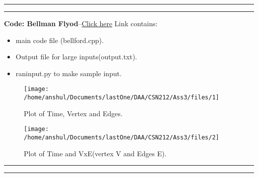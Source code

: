 \documentclass[a4paper,12pt]{article}
\begin{document}
\rule[0.4pt-1em]{0.4pt}{1em}\hrulefill\rule[0.4pt-1em]{0.4pt}{1em}
\begin{center}
\textbf{Code: Bellman Flyod}--\href{https://github.com/anshumitts/CSN212/tree/master/Ass3}{Click here}\newline
Link contains: 
\begin{itemize}
	\item main code file (bellford.cpp).
	\item Output file for large inputs(output.txt).
	\item raninput.py to make sample input.
\end{itemize}
\begin{figure}[!h]
  	\begin{minipage}{\linewidth}  
  	\begin{center}
    \texttt{[image: /home/anshul/Documents/lastOne/DAA/CSN212/Ass3/files/1]}
    \caption{Plot of Time, Vertex and Edges.}
    \end{center}
    \end{minipage}
	\begin{minipage}{\linewidth}  
	\begin{center}
    \texttt{[image: /home/anshul/Documents/lastOne/DAA/CSN212/Ass3/files/2]}
    \caption{Plot of Time and VxE(vertex V and Edges E).}
    \end{center}
    \end{minipage}
\end{figure}
\end{center}
\rule{0.4pt}{1em}\hrulefill\rule{0.4pt}{1em}
\end{document}
